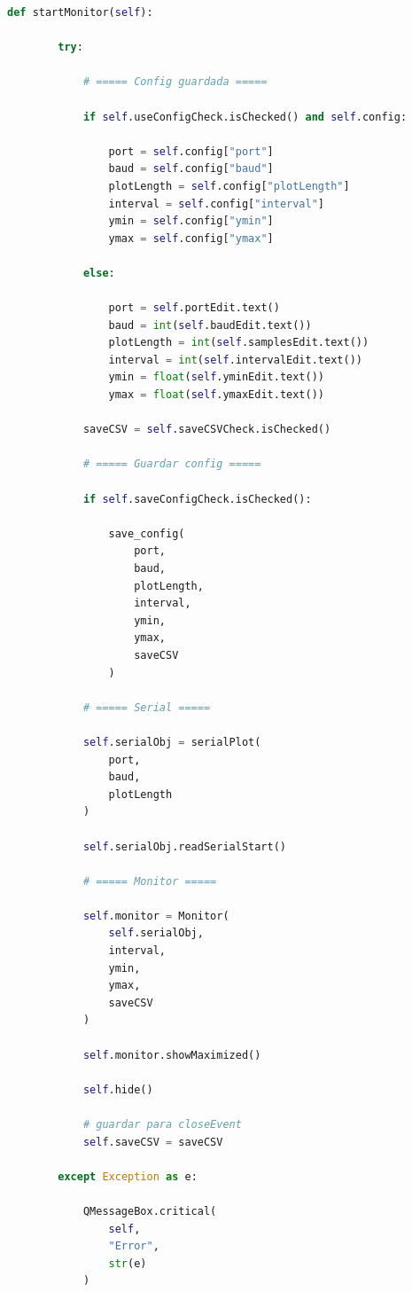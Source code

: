 \documentclass[12pt,letterpaper,twoside]{article}
\begin{document}
\begin{lstlisting}[language=Python]
    def startMonitor(self):

        try:

            # ===== Config guardada =====

            if self.useConfigCheck.isChecked() and self.config:

                port = self.config["port"]
                baud = self.config["baud"]
                plotLength = self.config["plotLength"]
                interval = self.config["interval"]
                ymin = self.config["ymin"]
                ymax = self.config["ymax"]

            else:

                port = self.portEdit.text()
                baud = int(self.baudEdit.text())
                plotLength = int(self.samplesEdit.text())
                interval = int(self.intervalEdit.text())
                ymin = float(self.yminEdit.text())
                ymax = float(self.ymaxEdit.text())

            saveCSV = self.saveCSVCheck.isChecked()

            # ===== Guardar config =====

            if self.saveConfigCheck.isChecked():

                save_config(
                    port,
                    baud,
                    plotLength,
                    interval,
                    ymin,
                    ymax,
                    saveCSV
                )

            # ===== Serial =====

            self.serialObj = serialPlot(
                port,
                baud,
                plotLength
            )

            self.serialObj.readSerialStart()

            # ===== Monitor =====

            self.monitor = Monitor(
                self.serialObj,
                interval,
                ymin,
                ymax,
                saveCSV
            )

            self.monitor.showMaximized()

            self.hide()

            # guardar para closeEvent
            self.saveCSV = saveCSV

        except Exception as e:

            QMessageBox.critical(
                self,
                "Error",
                str(e)
            )


\end{lstlisting}
\end{document}
